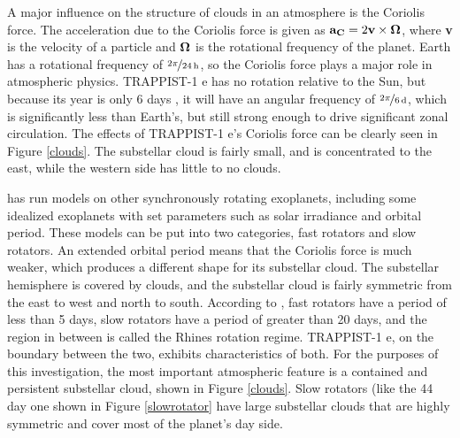 A major influence on the structure of clouds in an atmosphere is the Coriolis
 force. The acceleration due to the Coriolis force is given as
 ${\bf a_C}=2 \bf{v}\times{\bf \Omega}$, where {\bf v} is the velocity of a
 particle and $\bf{\Omega}$ is the rotational frequency of the planet. Earth has
 a rotational frequency of $\nicefrac{2\pi}{\SI{24}{\hour}}$, so the Coriolis
 force plays a major role in atmospheric physics. TRAPPIST-1 e has no rotation
 relative to the Sun, but because its year is only 6 days
 \citep{trappistdiscovery}, it will have an angular frequency of
 $\nicefrac{2\pi}{\SI{6}{\day}}$, which is significantly less than Earth's, but
 still strong enough to drive significant zonal circulation. The effects of
 TRAPPIST-1 e's Coriolis force can be clearly seen in Figure \ref{clouds}. The
 substellar cloud is fairly small, and is concentrated to the east, while the
 western side has little to no clouds.

\citet{ravihabitablemoist} has run models on other synchronously rotating
 exoplanets, including some idealized exoplanets with set parameters such as
 solar irradiance and orbital period. These models can be put into two
 categories, fast rotators and slow rotators. An extended orbital period means
 that the Coriolis force is much weaker, which produces a different
 shape for its substellar cloud. The substellar hemisphere is covered by clouds,
 and the substellar cloud is fairly symmetric from the east to west and north to
 south. According to \citet{haqqmisra18}, fast rotators have a period of less
 than 5 days, slow rotators have a period of greater than 20 days, and the
 region in between is called the Rhines rotation regime. TRAPPIST-1 e, on the
 boundary between the two, exhibits characteristics of both. For the purposes of
 this investigation, the most important atmospheric feature is a contained and persistent
 substellar cloud, shown in Figure \ref{clouds}. Slow rotators (like the 44 day
 one shown in Figure \ref{slowrotator} have large substellar clouds that are
 highly symmetric and cover most of the planet's day side.

